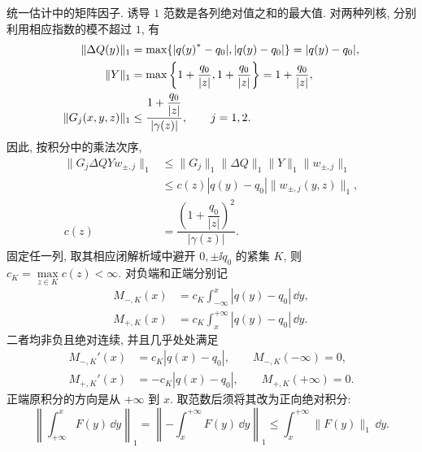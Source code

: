 \par\medskip\noindent 统一估计中的矩阵因子.\quad
诱导 $1$ 范数是各列绝对值之和的最大值. 对两种列核, 分别利用相应指数的模不超过 $1$, 有
\begin{align*}
\|\Delta Q(y)\|_1
&=\max\{|{q(y)}^{*}-q_0|,|q(y)-q_0|\}=|q(y)-q_0|,\\
\|Y\|_1
&=\max\left\{1+\dfrac{q_0}{|z|},1+\dfrac{q_0}{|z|}\right\}
=1+\dfrac{q_0}{|z|},\\
\|G_j(x,y,z)\|_1
&\le\dfrac{1+\dfrac{q_0}{|z|}}{|\gamma(z)|},\qquad j=1,2.
\end{align*}
因此, 按积分中的乘法次序,
\begin{align*}
\|G_j\Delta QYw_{\pm,j}\|_1
&\le\|G_j\|_1\|\Delta Q\|_1\|Y\|_1\|w_{\pm,j}\|_1\\
&\le c(z)|q(y)-q_0|\|w_{\pm,j}(y,z)\|_1,\\
c(z)&=\dfrac{\left(1+\dfrac{q_0}{|z|}\right)^2}{|\gamma(z)|}.
\end{align*}
固定任一列, 取其相应闭解析域中避开 $0,\pm\ii q_0$ 的紧集 $K$,
则 $c_K=\max\limits_{z\in K}c(z)<\infty$. 对负端和正端分别记
\begin{align*}
M_{-,K}(x)&=c_K\int_{-\infty}^{x}|q(y)-q_0|\,\dd y,\\
M_{+,K}(x)&=c_K\int_x^{+\infty}|q(y)-q_0|\,\dd y.
\end{align*}
二者均非负且绝对连续, 并且几乎处处满足
\begin{align*}
M_{-,K}'(x)&=c_K|q(x)-q_0|,\qquad M_{-,K}(-\infty)=0,\\
M_{+,K}'(x)&=-c_K|q(x)-q_0|,\qquad M_{+,K}(+\infty)=0.
\end{align*}
正端原积分的方向是从 $+\infty$ 到 $x$. 取范数后须将其改为正向绝对积分:
\begin{equation*}
\left\|\int_{+\infty}^{x}F(y)\,\dd y\right\|_1
=\left\|-\int_x^{+\infty}F(y)\,\dd y\right\|_1
\le\int_x^{+\infty}\|F(y)\|_1\,\dd y.
\end{equation*}

